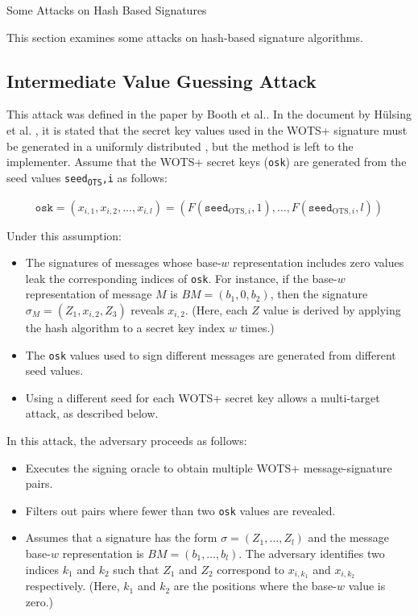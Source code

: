 \documentclass [version=submission]{iacrcc}
\begin{document}
\begin{section}{Some Attacks on Hash Based Signatures}


This section examines some attacks on hash-based signature algorithms.

\subsection{Intermediate Value Guessing Attack}

This attack was defined in the paper by Booth et al.\cite{booth2021intermediate}. In the document by Hülsing et al. \cite{huelsing2018rfc}, it is stated that the secret key values used in the WOTS+ signature must be generated in a uniformly distributed , but the method is left to the implementer. Assume that the WOTS+ secret keys (\texttt{osk}) are generated from the seed values \texttt{seed\textsubscript{OTS},i} as follows:

\[
\texttt{osk} = (x_{i,1}, x_{i,2}, \ldots, x_{i,l}) = (F(\texttt{seed}_{\text{OTS},i},1), \ldots, F(\texttt{seed}_{\text{OTS},i},l))
\]

Under this assumption:

\begin{itemize}
    \item The signatures of messages whose base-$w$ representation includes zero values leak the corresponding indices of \texttt{osk}. For instance, if the base-$w$ representation of message $M$ is $BM = (b_1, 0, b_2)$, then the signature $\sigma_M = (Z_1, x_{i,2}, Z_3)$ reveals $x_{i,2}$. (Here, each $Z$ value is derived by applying the hash algorithm to a secret key index $w$ times.)
    
    \item The \texttt{osk} values used to sign different messages are generated from different seed values.
    
    \item Using a different seed for each WOTS+ secret key allows a multi-target attack, as described below.
\end{itemize}

In this attack, the adversary proceeds as follows:

\begin{itemize}
    \item Executes the signing oracle to obtain multiple WOTS+ message-signature pairs.
    \item Filters out pairs where fewer than two \texttt{osk} values are revealed.
    \item Assumes that a signature has the form $\sigma = (Z_1, \ldots, Z_l)$ and the message base-$w$ representation is $BM = (b_1, \ldots, b_l)$. The adversary identifies two indices $k_1$ and $k_2$ such that $Z_1$ and $Z_2$ correspond to $x_{i,k_1}$ and $x_{i,k_2}$ respectively. (Here, $k_1$ and $k_2$ are the positions where the base-$w$ value is zero.)
    

\end{itemize}
\end{section}
\end{document}
